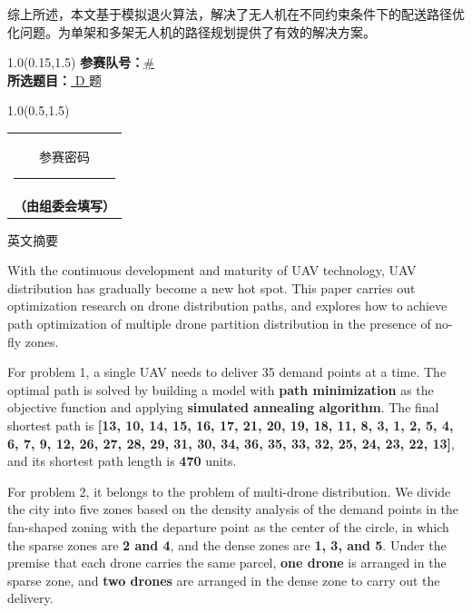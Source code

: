 \documentclass[a4paper]{article} %
\begin{document}
{综上所述，本文基于模拟退火算法，解决了无人机在不同约束条件下的配送路径优化问题。为单架和多架无人机的路径规划提供了有效的解决方案。

    \setlength{\TPHorizModule}{\textwidth}
    \setlength{\TPVertModule}{\textwidth}

    \begin{textblock}{1.0}(0.15,1.5)
        \large
        \textbf{参赛队号：}\underline{\# }
        \\

        \textbf{所选题目：}\underline{ D }题
    \end{textblock}

    \begin{textblock}{1.0}(0.5,1.5)
        \large
        \begin{center}
            \begin{tabular}{|c|}
                \hline
                参赛密码\rule{3cm}{0.05em}\\
                \textbf{（由组委会填写）}\\
                \hline
            \end{tabular}
        \end{center}
    \end{textblock}
    \thispagestyle{empty}
    \newpage
    \begin{center}
    {\songti 英文摘要}
\end{center}

    With the continuous development and maturity of UAV technology, UAV distribution has gradually become a new hot spot. This paper carries out optimization research on drone distribution paths, and explores how to achieve path optimization of multiple drone partition distribution in the presence of no-fly zones.

    For problem 1, a single UAV needs to deliver 35 demand points at a time. The optimal path is solved by building a model with\textbf{ path minimization} as the objective function and applying\textbf{ simulated annealing algorithm}. The final shortest path is \textbf{[13, 10, 14, 15, 16, 17, 21, 20, 19, 18, 11, 8, 3, 1, 2, 5, 4, 6, 7, 9, 12, 26, 27, 28, 29, 31, 30, 34, 36, 35, 33, 32, 25, 24, 23, 22, 13]}, and its shortest path length is \textbf{470} units.

    For problem 2, it belongs to the problem of multi-drone distribution. We divide the city into five zones based on the density analysis of the demand points in the fan-shaped zoning with the departure point as the center of the circle, in which the sparse zones are \textbf{2 and 4}, and the dense zones are \textbf{1, 3, and 5}. Under the premise that each drone carries the same parcel,\textbf{ one drone} is arranged in the sparse zone, and \textbf{two drones} are arranged in the dense zone to carry out the delivery.

}
\end{document}
